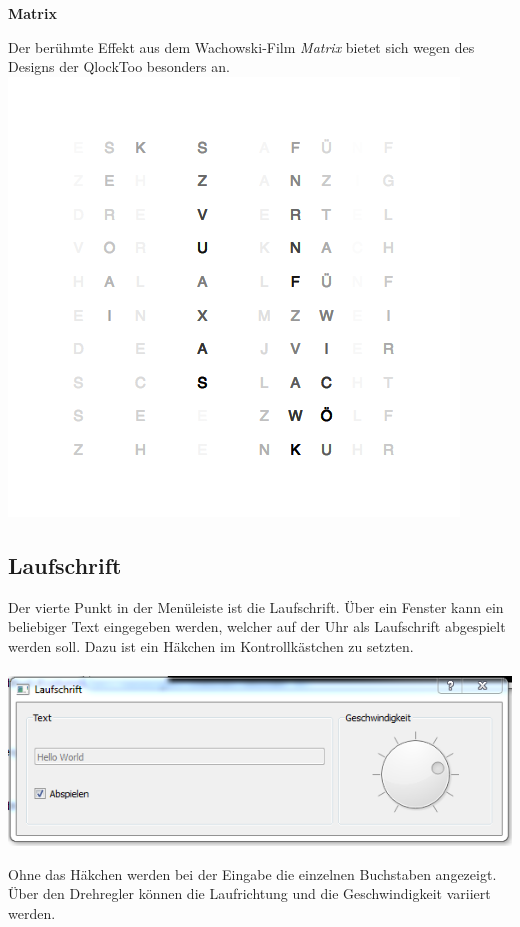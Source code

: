 \begin{multicols}{2}
\textbf{Matrix}

Der berühmte Effekt aus dem Wachowski-Film \emph{Matrix} bietet sich wegen des Designs der QlockToo besonders an.
\includegraphics[width=\columnwidth]{Abbildungen/Software/Demo/Matrix}

\subsection{Laufschrift}
Der vierte Punkt in der Menüleiste ist die Laufschrift. Über ein Fenster kann ein beliebiger Text eingegeben werden, welcher auf der Uhr als Laufschrift abgespielt werden soll. Dazu ist ein Häkchen im Kontrollkästchen zu setzten. \\
\\
{
    \centering
    \includegraphics[width=1\columnwidth]{Abbildungen/Software/Laufschrift02}
}

Ohne das Häkchen werden bei der Eingabe die einzelnen Buchstaben angezeigt. Über den Drehregler können die Laufrichtung und die Geschwindigkeit variiert werden.


\end{multicols}

